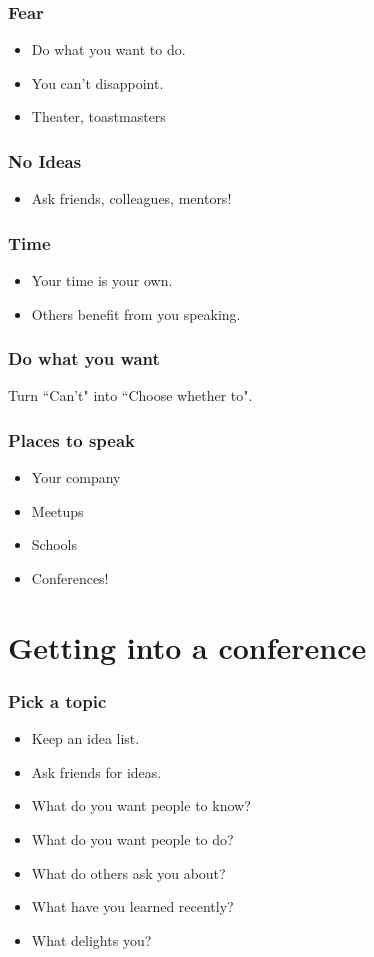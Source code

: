 \documentclass{beamer}
\begin{document}
\begin{frame}[fragile]
\frametitle{Fear}
\begin{itemize}
\item Do what you want to do.
\item You can't disappoint.
\item Theater, toastmasters
\end{itemize}
\end{frame}

\begin{frame}[fragile]
\frametitle{No Ideas}
\begin{itemize}
\item Ask friends, colleagues, mentors!
\end{itemize}
\end{frame}

\begin{frame}[fragile]
\frametitle{Time}
\begin{itemize}
\item Your time is your own.
\item Others benefit from you speaking.
\end{itemize}
\end{frame}

\begin{frame}[fragile]
\frametitle{Do what you want}
Turn ``Can't" into ``Choose whether to".
\end{frame}

\begin{frame}[fragile]
\frametitle{Places to speak}
\begin{itemize}
\item Your company
\item Meetups
\item Schools
\item Conferences!
\end{itemize}
\end{frame}

\section{Getting into a conference}

\begin{frame}[fragile]
\tableofcontents[currentsection]
\end{frame}

\begin{frame}
\frametitle{Pick a topic}
\begin{itemize}
\item Keep an idea list.
\item Ask friends for ideas.
\item What do you want people to know?
\item What do you want people to do?
\item What do others ask you about?
\item What have you learned recently?
\item What delights you?
\end{itemize}
\end{frame}
\end{document}
